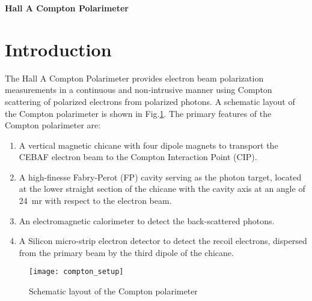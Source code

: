 \label{sec:compton}

\vspace{40pt}
\begin{center}
{\bf\LARGE Hall A Compton Polarimeter}
\end{center}
\vspace{40pt}
\newcommand{\dis}{\displaystyle}
\newcommand{\nn}{\nonumber}
\newcommand{\aexp}{A_{exp}}
\newcommand{\araw}{A_{raw}}
\newcommand{\ath}{A_{{th}}}
\newcommand{\ac}{A_{{c}}}
\newcommand{\af}{A_{{F}}}
\newcommand{\pe}{P_{{e}}}
\newcommand{\pg}{P_{\gamma}}
\newcommand{\np}{N^{+}}
\newcommand{\nm}{N^{-}}
\newcommand{\kp}{k^{\prime}}
\newcommand{\krs}{k^{\prime s}_{r}}
\newcommand{\sigrs}{\sigma^{s}_{r}}
\newcommand{\sigc}{\sigma_{c}}
\newcommand{\kmax}{k^{\prime}_{max}}
\newcommand{\wer}{\omega_R}
\newcommand{\wel}{\omega_L}

\section {Introduction}
\label{sec:compton_introduction}
The Hall A Compton
Polarimeter provides  electron beam polarization measurements in a continuous and non-intrusive manner
using  Compton scattering of polarized electrons from polarized photons. A schematic layout of the
Compton polarimeter is shown in Fig.\ref{fig:compton_setup}. The primary features of the Compton polarimeter are:
\begin{enumerate}
\item A vertical magnetic chicane with  four dipole magnets to transport  the CEBAF electron beam to the Compton Interaction Point (CIP).
\item A high-finesse Fabry-Perot (FP) cavity serving as the photon target, located at the lower straight section of the chicane with the cavity axis at  an angle of 24~mr with respect to  the electron beam.  
\item An electromagnetic calorimeter to detect the  back-scattered photons.
\item A Silicon micro-strip electron detector to detect the recoil electrons, dispersed  from the 
primary beam by the third dipole of the chicane.
\end{enumerate}

 \begin{figure}[htp]
    \begin{center}
        \texttt{[image: compton\_setup]}
    \end{center}
    \caption[compton:Schematic  layout]{
            Schematic layout of the  Compton polarimeter
            }
    \label{fig:compton_setup}
 \end{figure}


